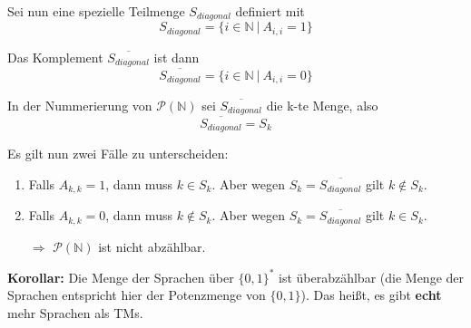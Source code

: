 \documentclass{scrartcl}%
\begin{document}
    \newpage
    Sei nun eine spezielle Teilmenge $S_{diagonal}$ definiert mit
    \begin{equation*}
        S_{diagonal} = \{i \in \mathbb{N} \ | \ A_{i,i} = 1 \}
    \end{equation*}

    Das Komplement $\overline{S_{diagonal}}$ ist dann
    \begin{equation*}
        \overline{S_{diagonal}} = \{i \in \mathbb{N} \ | \ A_{i,i} = 0 \}
    \end{equation*}

    \vspace*{0.5cm}
    In der Nummerierung von $\mathcal{P}(\mathbb{N})$ sei $\overline{S_{diagonal}}$ die k-te Menge, also
    \begin{equation*}
        \overline{S_{diagonal}} = S_k
    \end{equation*}

    Es gilt nun zwei Fälle zu unterscheiden:
    \begin{enumerate}
        \item Falls $A_{k,k} = 1$, dann muss $k \in S_k$. Aber wegen $S_k = \overline{S_{diagonal}}$ gilt $k \notin S_k$.
        \item Falls $A_{k,k} = 0$, dann muss $k \notin S_k$. Aber wegen $S_k = \overline{S_{diagonal}}$ gilt $k \in S_k$.
        \item [$\Rightarrow$] $\mathcal{P}(\mathbb{N})$ ist nicht abzählbar.    \proofend
    \end{enumerate}

    \textbf{\textsf{Korollar:}} Die Menge der Sprachen über $\{0,1\}^*$ ist überabzählbar
    (die Menge der Sprachen entspricht hier der Potenzmenge von $\{0,1\}$). Das heißt, es gibt \textsf{\textbf{echt}} mehr Sprachen als TMs.
\end{document}
